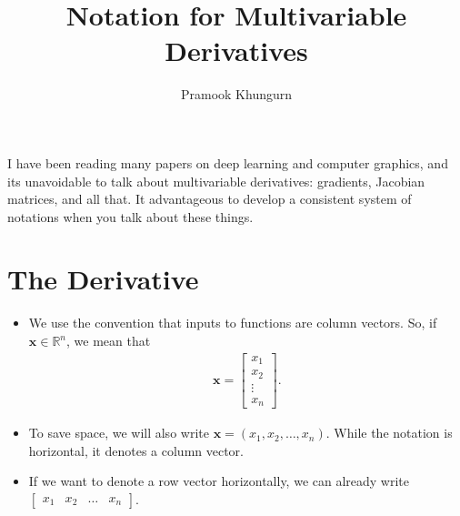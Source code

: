 \documentclass[10pt]{article}
\title{Notation for Multivariable Derivatives}
\author{Pramook Khungurn}
\newcommand{\ve}[1]{\mathbf{#1}}
\newcommand{\Real}{\mathbb{R}}
\begin{document}
\maketitle

I have been reading many papers on deep learning and computer graphics, and its unavoidable to talk about multivariable derivatives: gradients, Jacobian matrices, and all that. It advantageous to develop a consistent system of notations when you talk about these things.

\section{The Derivative}

\begin{itemize}
  \item We use the convention that inputs to functions are column vectors. So, if $\ve{x} \in \Real^n$, we mean that
  \begin{align*}
    \ve{x} = \begin{bmatrix}
      x_1 \\ x_2 \\ \vdots \\ x_n
    \end{bmatrix}. 
  \end{align*}

  \item To save space, we will also write $\ve{x} = (x_1, x_2, \dotsc, x_n)$. While the notation is horizontal, it denotes a column vector.
  
  \item If we want to denote a row vector horizontally, we can already write $\begin{bmatrix} x_1 & x_2 & \dotsc & x_n \end{bmatrix}$.


\end{itemize}
\end{document}
